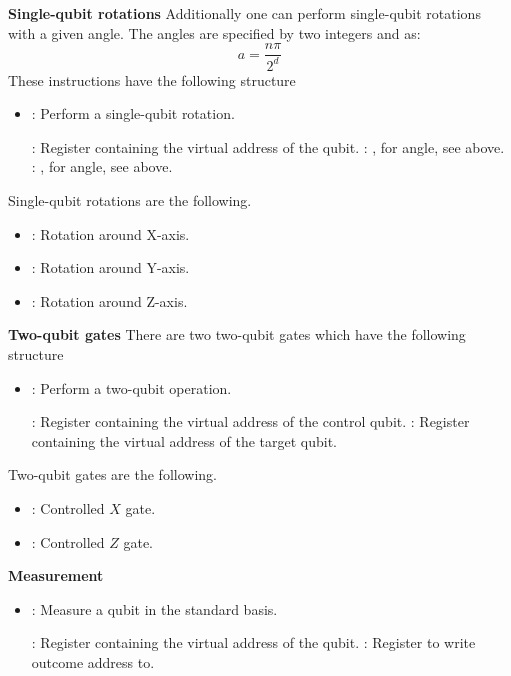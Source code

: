 \textbf{Single-qubit rotations}
Additionally one can perform single-qubit rotations with a given angle.
The angles  are specified by two integers  and  as:
\begin{equation}
  a = \frac{n\pi}{2^d}
\end{equation}
These instructions have the following structure
\begin{itemize}
  \item {}: Perform a single-qubit rotation.

        : Register containing the virtual address of the qubit.
        : , for angle, see above.
        : , for angle, see above.
\end{itemize}

Single-qubit rotations are the following.
\begin{itemize}
  \item {}: Rotation around X-axis.
  \item {}: Rotation around Y-axis.
  \item {}: Rotation around Z-axis.
\end{itemize}

\textbf{Two-qubit gates}
There are two two-qubit gates which have the following structure
\begin{itemize}
  \item {}: Perform a two-qubit operation.

        : Register containing the virtual address of the control qubit.
        : Register containing the virtual address of the target qubit.
\end{itemize}

Two-qubit gates are the following.
\begin{itemize}
  \item {}: Controlled $X$ gate.
  \item {}: Controlled $Z$ gate.
\end{itemize}

\textbf{Measurement}
\begin{itemize}
  \item {}: Measure a qubit in the standard basis.

        : Register containing the virtual address of the qubit.
        : Register to write outcome address to.
\end{itemize}

